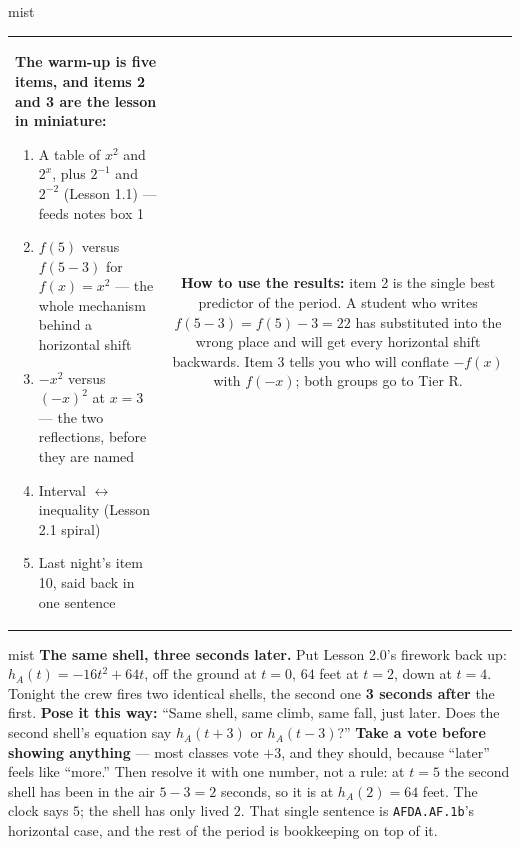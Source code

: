 \documentclass[10pt]{article}
\begin{document}
\begin{fixedskillbox}{mist}
\begin{tabularx}{\linewidth}{@{}X c@{}}
\begin{minipage}[t]{0.55\linewidth}\vspace{0pt}
\textbf{The warm-up is five items, and items 2 and 3 are the lesson in miniature:}
\begin{enumerate}[leftmargin=1.4em, itemsep=1pt, topsep=2pt]
  \item A table of $x^2$ and $2^x$, plus $2^{-1}$ and $2^{-2}$ (Lesson 1.1) --- feeds notes box 1
  \item $f(5)$ versus $f(5-3)$ for $f(x)=x^2$ --- the whole mechanism behind a horizontal shift
  \item $-x^2$ versus $(-x)^2$ at $x=3$ --- the two reflections, before they are named
  \item Interval $\leftrightarrow$ inequality (Lesson 2.1 spiral)
  \item Last night's item 10, said back in one sentence
\end{enumerate}
\end{minipage}
&
\begin{minipage}[t]{0.38\linewidth}\vspace{0pt}
\textbf{How to use the results:} item 2 is the single best predictor of the period. A student who
writes $f(5-3)=f(5)-3=22$ has substituted into the wrong place and will get every horizontal shift
backwards. Item 3 tells you who will conflate $-f(x)$ with $f(-x)$; both groups go to Tier R.
\end{minipage}
\end{tabularx}
\end{fixedskillbox}

\begin{skillbox}[Hook]{mist}
\textbf{The same shell, three seconds later.} Put Lesson 2.0's firework back up:
$h_A(t)=-16t^2+64t$, off the ground at $t=0$, $64$ feet at $t=2$, down at $t=4$. Tonight the crew
fires two identical shells, the second one \textbf{3 seconds after} the first.
\textbf{Pose it this way:} ``Same shell, same climb, same fall, just later. Does the second shell's
equation say $h_A(t+3)$ or $h_A(t-3)$?'' \textbf{Take a vote before showing anything} --- most
classes vote $+3$, and they should, because ``later'' feels like ``more.'' Then resolve it with one
number, not a rule: at $t=5$ the second shell has been in the air $5-3=2$ seconds, so it is at
$h_A(2)=64$ feet. The clock says $5$; the shell has only lived $2$. That single sentence is
\texttt{AFDA.AF.1b}'s horizontal case, and the rest of the period is bookkeeping on top of it.
\end{skillbox}
\end{document}
